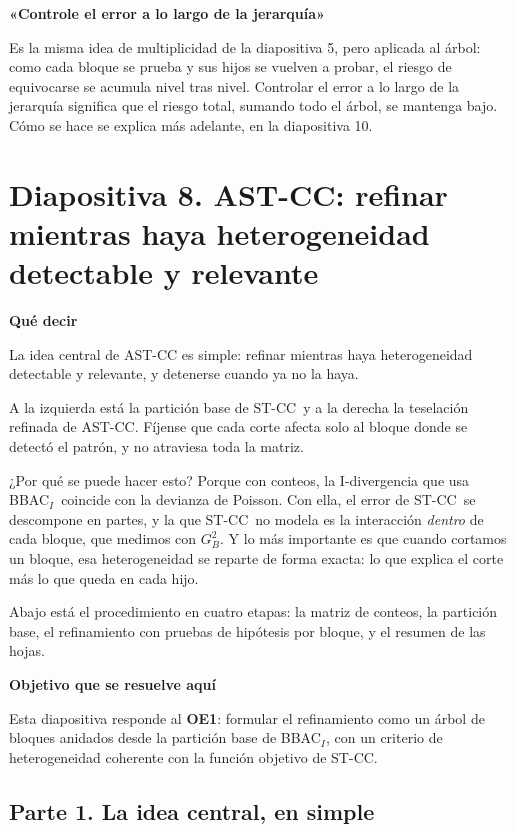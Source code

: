 \documentclass[11pt,a4paper]{article}
\newcommand{\cajainicio}[3]{\par\medskip\noindent
  \begin{lrbox}{\cajabox}\begin{minipage}{\dimexpr\linewidth-2\fboxsep-2\fboxrule\relax}%
  \textbf{\color{#1}#3}\par\smallskip}
\newcommand{\cajafin}[2]{\end{minipage}\end{lrbox}\fcolorbox{#1}{#2}{\usebox{\cajabox}}\par\medskip}
\newenvironment{guion}{\cajainicio{ucspblue}{ucspblue!6}{Qué decir}}{\cajafin{ucspblue}{ucspblue!6}}
\newenvironment{nota}[1]{\cajainicio{acc}{acc!7}{#1}}{\cajafin{acc}{acc!7}}
\newcommand{\STCC}{ST-CC}
\newcommand{\BBAC}{BBAC$_I$}
\begin{document}
\begin{nota}{«Controle el error a lo largo de la jerarquía»}
Es la misma idea de multiplicidad de la diapositiva 5, pero aplicada al árbol: como cada bloque se prueba y sus hijos se vuelven a probar, el riesgo de equivocarse se acumula nivel tras nivel. Controlar el error a lo largo de la jerarquía significa que el riesgo total, sumando todo el árbol, se mantenga bajo. Cómo se hace se explica más adelante, en la diapositiva 10.
\end{nota}

\newpage
\section*{Diapositiva 8. AST-CC: refinar mientras haya heterogeneidad detectable y relevante}

\begin{guion}
La idea central de AST-CC es simple: refinar mientras haya heterogeneidad detectable y relevante, y detenerse cuando ya no la haya.

A la izquierda está la partición base de \STCC\ y a la derecha la teselación refinada de AST-CC. Fíjense que cada corte afecta solo al bloque donde se detectó el patrón, y no atraviesa toda la matriz.

¿Por qué se puede hacer esto? Porque con conteos, la I-divergencia que usa \BBAC\ coincide con la devianza de Poisson. Con ella, el error de \STCC\ se descompone en partes, y la que \STCC\ no modela es la interacción \emph{dentro} de cada bloque, que medimos con $G^2_B$. Y lo más importante es que cuando cortamos un bloque, esa heterogeneidad se reparte de forma exacta: lo que explica el corte más lo que queda en cada hijo.

Abajo está el procedimiento en cuatro etapas: la matriz de conteos, la partición base, el refinamiento con pruebas de hipótesis por bloque, y el resumen de las hojas.
\end{guion}

\begin{nota}{Objetivo que se resuelve aquí}
Esta diapositiva responde al \textbf{OE1}: formular el refinamiento como un árbol de bloques anidados desde la partición base de \BBAC, con un criterio de heterogeneidad coherente con la función objetivo de \STCC.
\end{nota}

\subsection*{Parte 1. La idea central, en simple}
\end{document}
